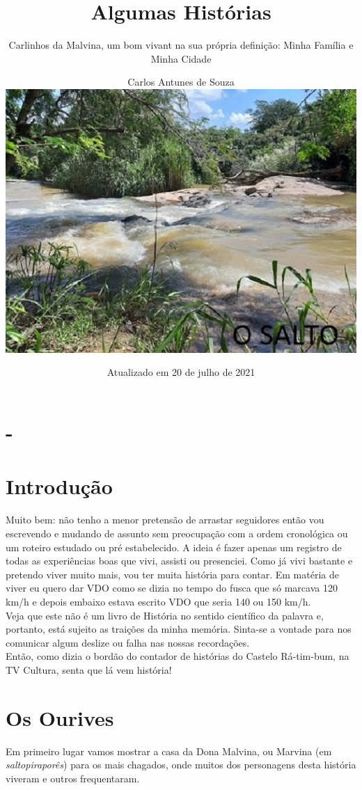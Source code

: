 \documentclass[12pt,brazil,]{book}
\title{Algumas Histórias}
\subtitle{Carlinhos da Malvina, um bom vivant na sua própria definição: Minha
Família e Minha Cidade}
\author{Carlos Antunes de Souza

\includegraphics{Imagens/OSALTOB.JPEG}}
\date{Atualizado em 20 de julho de 2021}
\begin{document}
\maketitle

{
\setcounter{tocdepth}{1}
\tableofcontents
}
\chapter*{-}\label{section}

\chapter*{Introdução}\label{introduuxe7uxe3o}

Muito bem: não tenho a menor pretensão de arrastar seguidores então vou
escrevendo e mudando de assunto sem preocupação com a ordem cronológica
ou um roteiro estudado ou pré estabelecido. A ideia é fazer apenas um
registro de todas as experiências boas que vivi, assisti ou presenciei.
Como já vivi bastante e pretendo viver muito mais, vou ter muita
história para contar. Em matéria de viver eu quero dar VDO como se dizia
no tempo do fusca que só marcava 120 km/h e depois embaixo estava
escrito VDO que seria 140 ou 150 km/h.\\
Veja que este não é um livro de História no sentido científico da
palavra e, portanto, está sujeito as traições da minha memória. Sinta-se
a vontade para nos comunicar algum deslize ou falha nas nossas
recordações.\\
Então, como dizia o bordão do contador de histórias do Castelo
Rá-tim-bum, na TV Cultura, senta que lá vem história!

\chapter{Os Ourives}\label{os-ourives}

Em primeiro lugar vamos mostrar a casa da Dona Malvina, ou Marvina (em
\emph{saltopiraporês}) para os mais chagados, onde muitos dos
personagens desta história viveram e outros frequentaram.
\end{document}
